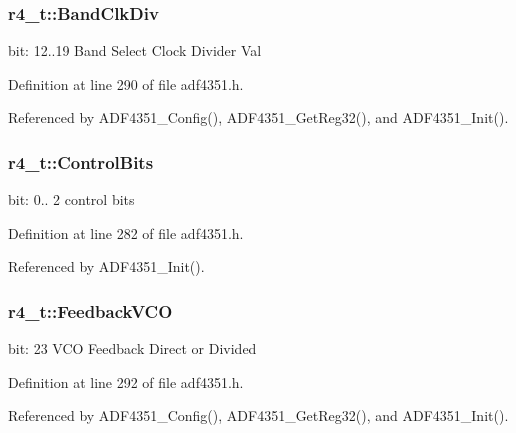 \subsubsection[{\texorpdfstring{Band\+Clk\+Div}{BandClkDiv}}]{ r4\+\_\+t\+::\+Band\+Clk\+Div}\hypertarget{structr4__t_af9bbf20145437bb5913e815a71cc3eb5}{}\label{structr4__t_af9bbf20145437bb5913e815a71cc3eb5}
bit\+: 12..19 Band Select Clock Divider Val 

Definition at line 290 of file adf4351.\+h.



Referenced by A\+D\+F4351\+\_\+\+Config(), A\+D\+F4351\+\_\+\+Get\+Reg32(), and A\+D\+F4351\+\_\+\+Init().

\subsubsection[{\texorpdfstring{Control\+Bits}{ControlBits}}]{ r4\+\_\+t\+::\+Control\+Bits}\hypertarget{structr4__t_a9f03fbb2e74ac5c97c73cd70755d95eb}{}\label{structr4__t_a9f03fbb2e74ac5c97c73cd70755d95eb}
bit\+: 0.. 2 control bits 

Definition at line 282 of file adf4351.\+h.



Referenced by A\+D\+F4351\+\_\+\+Init().

\subsubsection[{\texorpdfstring{Feedback\+V\+CO}{FeedbackVCO}}]{ r4\+\_\+t\+::\+Feedback\+V\+CO}\hypertarget{structr4__t_af070024e13538726836fc1c405aa0124}{}\label{structr4__t_af070024e13538726836fc1c405aa0124}
bit\+: 23 V\+CO Feedback Direct or Divided 

Definition at line 292 of file adf4351.\+h.



Referenced by A\+D\+F4351\+\_\+\+Config(), A\+D\+F4351\+\_\+\+Get\+Reg32(), and A\+D\+F4351\+\_\+\+Init().

